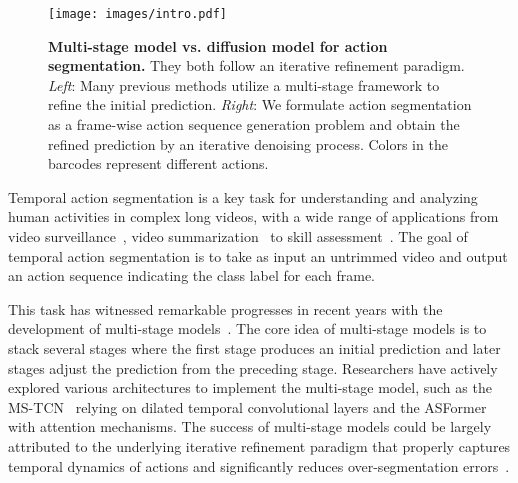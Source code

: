 \documentclass[10pt,twocolumn,letterpaper]{article}
\begin{document}
\begin{figure}[t]
\begin{center}
   \texttt{[image: images/intro.pdf]}
\end{center}
   \caption{\textbf{Multi-stage model vs. diffusion model for action segmentation.} They both follow an iterative refinement paradigm. \textit{Left}: Many previous methods utilize a multi-stage framework to refine the initial prediction. \textit{Right}: We formulate action segmentation as a frame-wise action sequence generation problem and obtain the refined prediction by an iterative denoising process. Colors in the barcodes represent different actions.}
\label{fig:intro}
\vspace{-0.5cm}
\end{figure}



Temporal action segmentation is a key task for understanding and analyzing human activities in complex long videos, with a wide range of applications from video surveillance~\cite{Surveillance}, video summarization~\cite{Summarization} to skill assessment~\cite{Skill}.
The goal of temporal action segmentation is to take as input an untrimmed video and output an action sequence indicating the class label for each frame.

This task has witnessed remarkable progresses in recent years with the development of multi-stage models~\cite{2019_CVPR_Farha,2020_PAMI_Li,2020_ECCV_Wang,2021_BMVC_Yi}.
The core idea of multi-stage models is to stack several stages where the first stage produces
an initial prediction and later stages adjust the prediction from the preceding stage.
Researchers have actively explored various architectures to implement the multi-stage model, such as the MS-TCN~\cite{2019_CVPR_Farha,2020_PAMI_Li} relying on dilated temporal convolutional layers and the ASFormer~\cite{2021_BMVC_Yi} with attention mechanisms. 
The success of multi-stage models could be largely attributed to the underlying iterative refinement paradigm that properly captures temporal dynamics of actions and significantly reduces over-segmentation errors~\cite{2022_Arxiv_Ding}.
\end{document}
